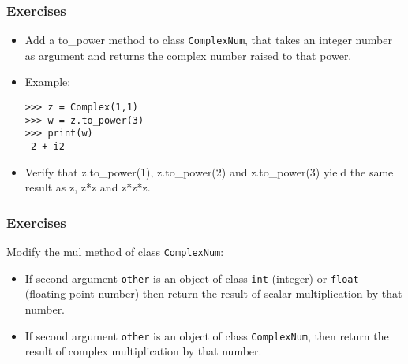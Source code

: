 \begin{frame}[fragile]\frametitle{Exercises}
\begin{itemize}
\item Add a to\_power method to class \texttt{ComplexNum},
    that takes an integer number as argument and returns the complex
    number raised to that power.

\item 
    Example:
\begin{lstlisting}
>>> z = Complex(1,1)
>>> w = z.to_power(3)
>>> print(w)
-2 + i2
\end{lstlisting}

\item 
Verify that z.to\_power(1),
    z.to\_power(2) and z.to\_power(3) yield the
    same result as z, z*z and
    z*z*z.
\end{itemize}
\end{frame}



\begin{frame}[fragile]\frametitle{Exercises}
    Modify the mul method of class \texttt{ComplexNum}:
    \begin{itemize}
    \item If second argument \texttt{other} is an object of class
      \texttt{int} (integer) or \texttt{float} (floating-point
      number) then return the result of scalar multiplication by that number.
    \item If second argument \texttt{other} is an object of class
      \texttt{ComplexNum}, then return the result of complex
      multiplication by that number.
    \end{itemize}
\end{frame}

